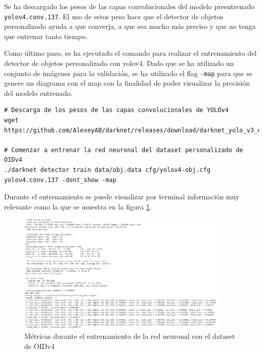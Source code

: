 Se ha descargado los pesos de las capas convolucionales del modelo preentrenado \texttt{yolov4.conv.137}. El uso de estos peso hace que el detector de objetos personalizado ayuda a que converja, a que sea mucho más preciso y que no tenga que entrenar tanto tiempo.

Como último paso, se ha ejecutado el comando para realizar el entrenamiento del detector de objetos personalizado con \gls{yolov4}. Dado que se ha utilizado un conjunto de imágenes para la validación, se ha utilizado el flag \texttt{-map} para que se genere un diagrama con el \gls{map} con la finalidad de poder visualizar la precisión del modelo entrenado.

\vspace{0.5cm}
\begin{lstlisting}[language=iPython,caption=Entrenamiento del dataset personalizado,captionpos=b,label={lst:training-custom-dataset}]
# Descarga de los pesos de las capas convolucionales de YOLOv4
wget https://github.com/AlexeyAB/darknet/releases/download/darknet_yolo_v3_optimal/yolov4.conv.137

# Comenzar a entrenar la red neuronal del dataset personalizado de OIDv4
./darknet detector train data/obj.data cfg/yolov4-obj.cfg yolov4.conv.137 -dont_show -map
\end{lstlisting}

Durante el entrenamiento se puede visualizar por terminal información muy relevante como la que se muestra en la figura \ref{fig:metrics-during-train}.

\begin{figure}[ht]
\centering
\includegraphics[width=0.9\textwidth]{img/chapters/resultados/metricas/metrics-during-training.png}
\caption{\label{fig:metrics-during-train}Métricas durante el entrenamiento de la red neuronal con el dataset de OIDv4}
\end{figure}

